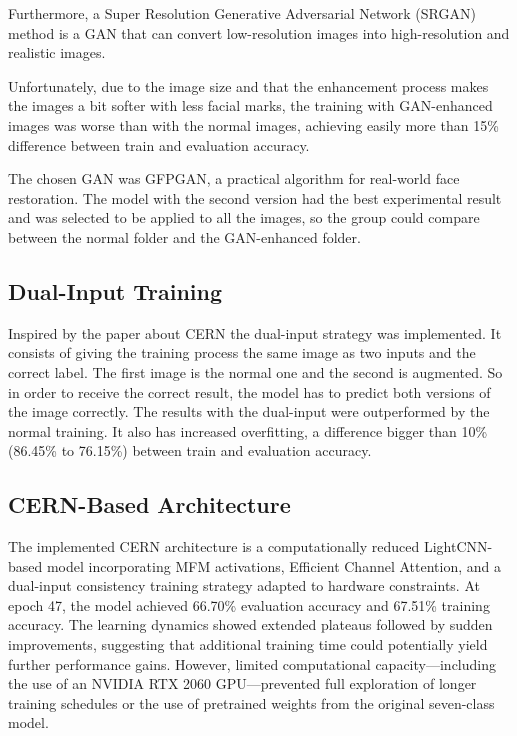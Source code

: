 Furthermore, a Super Resolution Generative Adversarial Network (SRGAN) method is a GAN that can convert low-resolution images into high-resolution and realistic images. \cite{WEI2024127207}

Unfortunately, due to the image size and that the enhancement process makes the images a bit softer with less facial marks, the training with GAN-enhanced images was worse than with the normal images, achieving easily more than 15\% difference between train and evaluation accuracy.

The chosen GAN was GFPGAN, a practical algorithm for real-world face restoration. The model with the second version had the best experimental result and was selected to be applied to all the images, so the group could compare between the normal folder and the GAN-enhanced folder. 


\subsection{Dual-Input Training}

Inspired by the paper about CERN \cite{GERA20229} the dual-input strategy was implemented. It consists of giving the training process the same image as two inputs and the correct label. The first image is the normal one and the second is augmented. So in order to receive the correct result, the model has to predict both versions of the image correctly. The results with the dual-input were outperformed by the normal training. It also has increased overfitting, a difference bigger than 10\% (86.45\% to 76.15\%) between train and evaluation accuracy.

\subsection{CERN-Based Architecture}

The implemented CERN architecture is a computationally reduced LightCNN-based model incorporating MFM activations, Efficient Channel Attention, and a dual-input consistency training strategy adapted to hardware constraints.
At epoch 47, the model achieved 66.70\% evaluation accuracy and 67.51\% training accuracy. The learning dynamics showed extended plateaus followed by sudden improvements, suggesting that additional training time could potentially yield further performance gains. However, limited computational capacity—including the use of an NVIDIA RTX 2060 GPU—prevented full exploration of longer training schedules or the use of pretrained weights from the original seven-class model.

